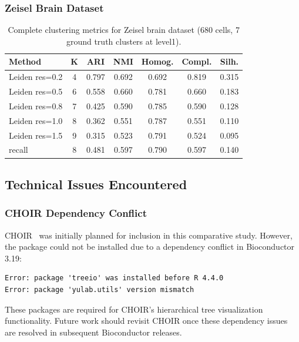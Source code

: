 \subsubsection{Zeisel Brain Dataset}

\begin{table}[htbp]
\centering
\caption{Complete clustering metrics for Zeisel brain dataset (680 cells, 7 ground truth clusters at level1).}
\label{tab:zeisel_full}
\small
\begin{tabular}{@{}lcccccc@{}}
\toprule
\textbf{Method} & \textbf{K} & \textbf{ARI} & \textbf{NMI} & \textbf{Homog.} & \textbf{Compl.} & \textbf{Silh.} \\
\midrule
Leiden res=0.2 & 4 & 0.797 & 0.692 & 0.692 & 0.819 & 0.315 \\
Leiden res=0.5 & 6 & 0.558 & 0.660 & 0.781 & 0.660 & 0.183 \\
Leiden res=0.8 & 7 & 0.425 & 0.590 & 0.785 & 0.590 & 0.128 \\
Leiden res=1.0 & 8 & 0.362 & 0.551 & 0.787 & 0.551 & 0.110 \\
Leiden res=1.5 & 9 & 0.315 & 0.523 & 0.791 & 0.524 & 0.095 \\
recall & 8 & 0.481 & 0.597 & 0.790 & 0.597 & 0.140 \\
\bottomrule
\end{tabular}
\end{table}

\subsection{Technical Issues Encountered}

\subsubsection{CHOIR Dependency Conflict}

CHOIR~\cite{sant2025choir} was initially planned for inclusion in this comparative study. However, the package could not be installed due to a dependency conflict in Bioconductor 3.19:

\begin{lstlisting}[caption={CHOIR installation error}]
Error: package 'treeio' was installed before R 4.4.0
Error: package 'yulab.utils' version mismatch
\end{lstlisting}

These packages are required for CHOIR's hierarchical tree visualization functionality. Future work should revisit CHOIR once these dependency issues are resolved in subsequent Bioconductor releases.

